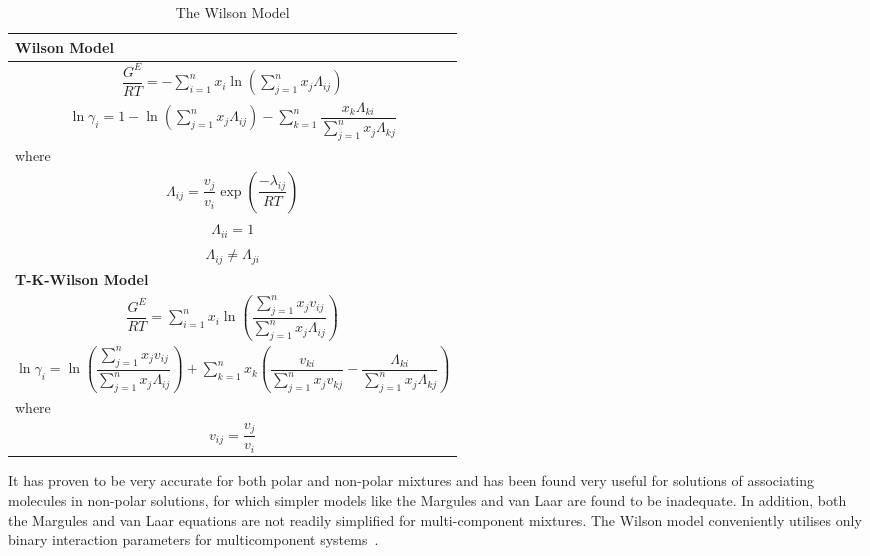 \begin{table}
			\caption{The Wilson Model}\label{WilsonTable}
			\begin{center}
			\begin{tabularx}{\textwidth}{Xc}
			\hline
			\textbf{Wilson Model}&\\
			\hline
			\multicolumn{2}{c}{$\dfrac{G^{E}}{RT} = - \sum_{i=1}^{n} x_{i} \ln \left(\sum_{j=1}^{n}x_{j}\Lambda_{ij}\right)$}\\
			\multicolumn{2}{c}{$ \ln \gamma_{i} = 1- \ln\left(\sum_{j=1}^{n}x_{j}\Lambda_{ij}\right) - \sum_{k=1}^{n} \dfrac{x_{k}\Lambda_{ki}}{\sum_{j=1}^{n}x_{j}\Lambda_{kj}}$}\\
			where&\\
			\multicolumn{2}{c}{$\Lambda_{ij} = \dfrac{v_{j}}{v_{i}}\exp\left(\dfrac{-\lambda_{ij}}{RT}\right)$}\\
			\multicolumn{2}{c}{$\Lambda_{ii} = 1$}\\
			\multicolumn{2}{c}{$\Lambda_{ij} \neq \Lambda_{ji}$}\\			
			\hline
			\textbf{T-K-Wilson Model}&\\
			\hline
			\multicolumn{2}{c}{$\dfrac{G^{E}}{RT} = \sum_{i=1}^{n} x_{i} \ln \left(\dfrac{\sum_{j=1}^{n}x_{j}v_{ij}}{\sum_{j=1}^{n}x_{j}\Lambda_{ij}}\right)$}\\	
			\multicolumn{2}{c}{$ \ln \gamma_{i} = \ln \left(\dfrac{\sum_{j=1}^{n}x_{j}v_{ij}}{\sum_{j=1}^{n}x_{j}\Lambda_{ij}}\right) + \sum_{k=1}^{n} x_{k}\left(\dfrac{v_{ki}}{\sum_{j=1}^{n}x_{j}v_{kj}}-\dfrac{\Lambda_{ki}}{\sum_{j=1}^{n}x_{j} \Lambda_{kj}}\right)$}\\
			where&\\
			\multicolumn{2}{c}{$v_{ij} = \dfrac{v_{j}}{v_{i}}$}\\			
			\hline
			\end{tabularx}
			\end{center}
\end{table}

It has proven to be very accurate for both polar and non-polar mixtures and has been found very useful for solutions of associating molecules in non-polar solutions, for which simpler models like the Margules and van Laar are found to be inadequate. In addition, both the Margules and van Laar equations are not readily simplified for multi-component mixtures. The Wilson model conveniently utilises only binary interaction parameters for multicomponent systems~\cite{ThermophysicalProperties,MolecularThermodynamicsOfFluidPhaseEquilibria}. \\


